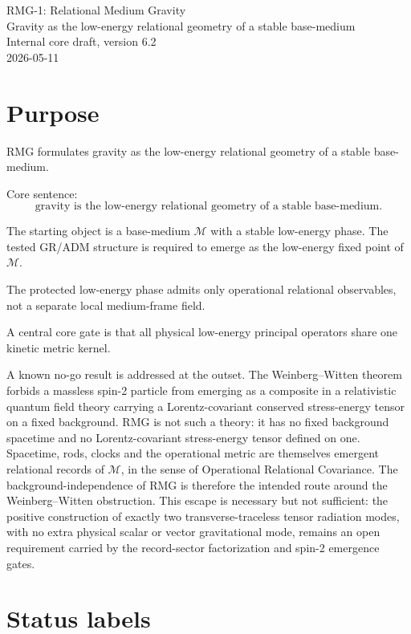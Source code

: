 \documentclass[11pt]{article}
\begin{document}
\begin{center}
{\Large RMG-1: Relational Medium Gravity}\\
\vspace{0.4em}
{\large Gravity as the low-energy relational geometry of a stable base-medium}\\
\vspace{0.4em}
Internal core draft, version 6.2\\
2026-05-11
\end{center}

\section*{Purpose}

RMG formulates gravity as the low-energy relational geometry of a stable
base-medium.

Core sentence:
\[
\boxed{
\text{gravity is the low-energy relational geometry of a stable base-medium.}
}
\]

The starting object is a base-medium $\mathcal M$ with a stable low-energy
phase.  The tested GR/ADM structure is required to emerge as the low-energy
fixed point of $\mathcal M$.

The protected low-energy phase admits only operational relational observables,
not a separate local medium-frame field.

A central core gate is that all physical low-energy principal operators share
one kinetic metric kernel.

A known no-go result is addressed at the outset.  The Weinberg--Witten
theorem forbids a massless spin-2 particle from emerging as a composite
in a relativistic quantum field theory carrying a Lorentz-covariant
conserved stress-energy tensor on a fixed background.  RMG is not such a
theory: it has no fixed background spacetime and no Lorentz-covariant
stress-energy tensor defined on one.  Spacetime, rods, clocks and the
operational metric are themselves emergent relational records of
$\mathcal M$, in the sense of Operational Relational Covariance.  The
background-independence of RMG is therefore the intended route around
the Weinberg--Witten obstruction.  This escape is necessary but not
sufficient: the positive construction of exactly two
transverse-traceless tensor radiation modes, with no extra physical
scalar or vector gravitational mode, remains an open requirement
carried by the record-sector factorization and spin-2 emergence gates.

\section*{Status labels}
\end{document}

